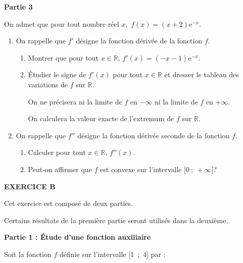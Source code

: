 \documentclass[11pt]{article}
\newcommand{\R}{\mathbb{R}}
\begin{document}
\bigskip

\begin{center}\textbf{Partie 3}\end{center}

On admet que pour tout nombre réel $x$,\, $f(x) = (x + 2)\text{e}^{-x}$.

\medskip

\begin{enumerate}
\item On rappelle que $f'$ désigne la fonction dérivée de la fonction $f$.
	\begin{enumerate}
		\item Montrer que pour tout $x \in \R,\, f'(x) = (-x - 1) \text{e}^{-x}$.
		\item Étudier le signe de $f'(x)$ pour tout $x \in \R$ et dresser le tableau des variations de $f$ sur $\R$.

On ne précisera ni la limite de $f$ en $- \infty$ ni la limite de $f$ en $+ \infty$.

On calculera la valeur exacte de l'extremum de $f$ sur $\R$.
	\end{enumerate}
\item On rappelle que $f''$ désigne la fonction dérivée seconde de la fonction $f$.
	\begin{enumerate}
		\item Calculer pour tout $x \in \R,\, f''(x)$.
		\item Peut-on affirmer que $f$ est convexe sur l'intervalle $[0~;~+\infty[$?
	\end{enumerate}
\end{enumerate}

\bigskip

\textbf{EXERCICE B}

\medskip


\medskip

Cet exercice est composé de deux parties.

\medskip

Certains résultats de la première partie seront utilisés dans la deuxième.

\medskip

\begin{center}\textbf{Partie 1 : Étude d'une fonction auxiliaire}\end{center}

Soit la fonction $f$ définie sur l'intervalle [1~;~4] par : 
\end{document}
